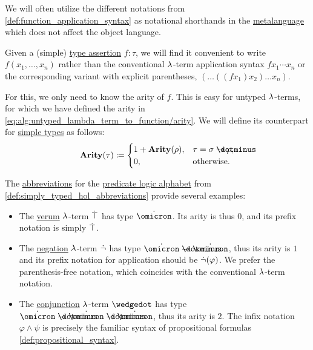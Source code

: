 \begin{remark}\label{rem:simple_type_function_syntax}
  We will often utilize the different notations from \cref{def:function_application_syntax} as notational shorthands in the \hyperref[con:metalogic]{metalanguage} which does not affect the object language.

  Given a (simple) \hyperref[con:type_annotation]{type assertion} \( f: \tau \), we will find it convenient to write \( f(x_1, \ldots, x_n) \) rather than the conventional \( {\mathrm \lambda} \)-term application syntax \( f x_1 \cdots x_n \) or the corresponding variant with explicit parentheses, \( (\ldots ((f x_1) x_2) \ldots x_n) \).

  For this, we only need to know the arity of \( f \). This is easy for untyped \( {\mathrm \lambda} \)-terms, for which we have defined the arity in \eqref{eq:alg:untyped_lambda_term_to_function/arity}. We will define its counterpart for \hyperref[def:simple_type]{simple types} as follows:
  \begin{equation*}
    \op*{Arity}(\tau) \coloneqq \begin{cases}
      1 + \op*{Arity}(\rho), &\tau = \sigma \synimplies \rho, \\
      0,                     &\T{otherwise.}
    \end{cases}
  \end{equation*}

  The \hyperref[con:metalingual_abbreviation]{abbreviations} for the \hyperref[def:predicate_logic_alphabet]{predicate logic alphabet} from \cref{def:simply_typed_hol_abbreviations} provide several examples:
  \begin{itemize}
    \item The \hyperref[def:propositional_alphabet/constants/verum]{verum} \( {\mathrm \lambda} \)-term \( \dot{\top} \) has type \( \syn\omicron \). Its arity is thus \( 0 \), and its prefix notation is simply \( \dot{\top} \).

    \item The \hyperref[def:propositional_alphabet/negation]{negation} \( {\mathrm \lambda} \)-term \( \dot{\neg} \) has type \( \syn\omicron \synimplies \syn\omicron \), thus its arity is \( 1 \) and its prefix notation for application should be \( \dot{\neg}(\varphi) \). We prefer the parenthesis-free notation, which coincides with the conventional \( {\mathrm \lambda} \)-term notation.

    \item The \hyperref[def:propositional_alphabet/connectives/conjunction]{conjunction} \( {\mathrm \lambda} \)-term \( \synwedge \) has type \( \syn\omicron \synimplies \syn\omicron \synimplies \syn\omicron \), thus its arity is \( 2 \). The infix notation \( \varphi \wedge \psi \) is precisely the familiar syntax of propositional formulas \cref{def:propositional_syntax}.


\end{itemize}
\end{remark}
